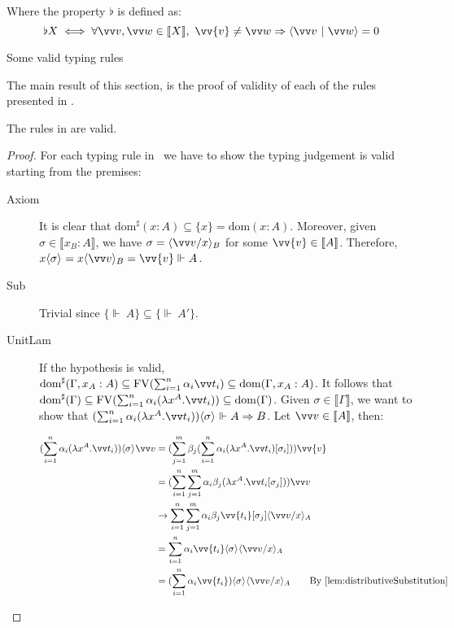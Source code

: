 \documentclass[runningheads,orivec,envcountsame,envcountsect]{llncs}
\newcommand\ansubst[2]{\ensuremath{\langle #1 \rangle_{#2}}}
\newcommand\dom[1]{\mathrm{dom}(#1)}
\newcommand\sdom[1]{\mathrm{dom}^{\sharp}(#1)}
\newcommand\FV[1]{\mathrm{FV}(#1)}
\def\scal#1#2{\langle{#1}~|~{#2}\rangle}
\def\Lam#1#2#3{\lambda#1^{#2}{.}#3} %
\def\Arr{\Rightarrow}
\def\sem#1{\llbracket#1\rrbracket}
\def\semr#1{\{{\real}~#1\}}
\def\real{\Vdash}
\begin{document}
\begin{table}[t]
    \parbox{\linewidth}{Where the property $\flat$ is defined as: 
    \[\flat X \iff \forall \vv v, \vv w\in\sem{X}, ~ \vv{v}\neq \vv w \Rightarrow \scal{\vv v}{\vv w} = 0
    \]
    }
    \caption{Some valid typing rules}
    \label{tab:TypingRules}
\end{table}

The main result of this section, is the proof of validity of each of the rules presented in .

\begin{theorem}
    The rules in  are valid.
\end{theorem}

\begin{proof}
    For each typing rule in ~we have to show the typing judgement is valid starting from the premises:
    \begin{description}
    \item[Axiom] It is clear that $\sdom{x:A}\subseteq\{x\}=\dom{x:A}$. Moreover, given $\sigma\in\sem{x_B:A}$, we have $\sigma=\ansubst{\vv v/x}{B}$ for some $\vv{v}\in\sem{A}$. Therefore, $x\ansubst{\sigma}{}=x\ansubst{\vv v}{B}=\vv{v}\real A$.
    
    \item[Sub] Trivial since $\semr{A}\subseteq\semr{A'}$. 

    \item[UnitLam] If the hypothesis is valid, $\sdom{\Gamma,x_A:A}\subseteq \FV{\sum_{i=1}^{n}\alpha_i \vv t_i}\subseteq \dom{\Gamma,x_A:A}$. It follows that $\sdom{\Gamma}\subseteq \FV{\sum_{i=1}^{n}\alpha_i (\Lam{x}{A}{\vv t_i})}\subseteq \dom{\Gamma}$. Given $\sigma\in\sem{\Gamma}$, we want to show that $(\sum_{i=1}^{n}\alpha_i (\Lam{x}{A}{\vv t_i}))\ansubst{\sigma}{}\real A\Arr B$. Let $\vv v\in\sem{A}$, then:
    
    \begin{align*}
        (\sum_{i=1}^{n} \alpha_i(\Lam{x}{A}{\vv t_i}))\ansubst{\sigma}{} \vv v&= (\sum_{j=1}^{m} \beta_j (\sum_{i=1}^{n} \alpha_i (\Lam{x}{A}{\vv t_i}) [\sigma_i])) \vv{v} \\
        &= (\sum_{i=1}^{n}\sum_{j=1}^{m}\alpha_i\beta_j (\Lam{x}{A}{\vv t_i[\sigma_j]}))\vv v\\
        &\to \sum_{i=1}^{n}\sum_{j=1}^{m}\alpha_i\beta_j \vv{t_i}[\sigma_j]\ansubst{\vv v/x}{A}\\
        &=\sum_{i=1}^{n}\alpha_i \vv{t_i}\ansubst{\sigma}{}\ansubst{\vv v/x}{A}\\
        &=(\sum_{i=1}^{n}\alpha_i \vv{t_i})\ansubst{\sigma}{}\ansubst{\vv v/x}{A}\qquad{\text{By \Cref{lem:distributiveSubstitution}}}
    \end{align*}
    

\end{description}
\end{proof}
\end{document}
